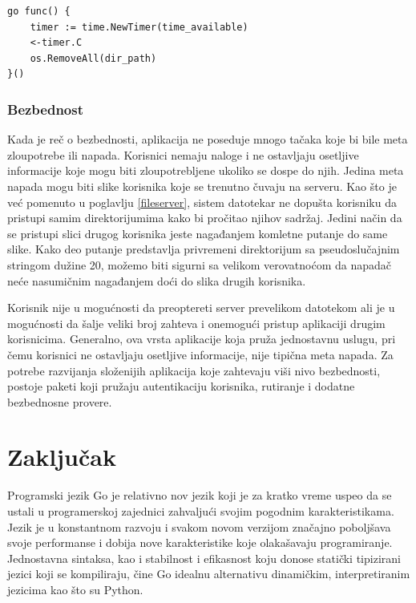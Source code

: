 \documentclass[12pt,oneside]{memoir}
\begin{document}
\begin{center}
\begin{lstlisting}[caption=Gorutina za brisanje privremenih direktorijuma,label={lst:clean},  backgroundcolor=\color{background}]
go func() {
	timer := time.NewTimer(time_available)
	<-timer.C
	os.RemoveAll(dir_path)
}()
\end{lstlisting}
\end{center}


\subsection{Bezbednost}

Kada je reč o bezbednosti, aplikacija ne poseduje mnogo tačaka koje bi bile meta zloupotrebe ili napada. Korisnici nemaju naloge i ne ostavljaju osetljive informacije koje mogu biti zloupotrebljene ukoliko se dospe do njih. Jedina meta napada mogu biti slike korisnika koje se trenutno čuvaju na serveru. Kao što je već pomenuto u poglavlju \ref{fileserver}, sistem datotekar ne dopušta korisniku da pristupi samim direktorijumima kako bi pročitao njihov sadržaj. Jedini način da se pristupi slici drugog korisnika jeste nagađanjem komletne putanje do same slike. Kako deo putanje predstavlja privremeni direktorijum sa pseudoslučajnim stringom dužine 20, možemo biti sigurni sa velikom verovatnoćom da napadač neće nasumičnim nagađanjem doći do slika drugih korisnika. 

Korisnik nije u mogućnosti da preoptereti server prevelikom datotekom ali je u mogućnosti da šalje veliki broj zahteva i onemogući pristup aplikaciji drugim korisnicima. Generalno, ova vrsta aplikacije koja pruža jednostavnu uslugu, pri čemu korisnici ne ostavljaju osetljive informacije, nije tipična meta napada. Za potrebe razvijanja složenijih aplikacija koje zahtevaju viši nivo bezbednosti, postoje paketi koji pružaju autentikaciju korisnika, rutiranje i dodatne bezbednosne provere. 

\chapter{Zaključak}

Programski jezik Go je relativno nov jezik koji je za kratko vreme uspeo da se ustali u programerskoj zajednici zahvaljući svojim pogodnim karakteristikama. Jezik je u konstantnom razvoju i svakom novom verzijom značajno poboljšava svoje performanse i dobija nove karakteristike koje olakašavaju programiranje. Jednostavna sintaksa, kao i stabilnost i efikasnost koju donose statički tipizirani jezici koji se kompiliraju, čine Go idealnu alternativu dinamičkim, interpretiranim jezicima kao što su Python.
\end{document}
